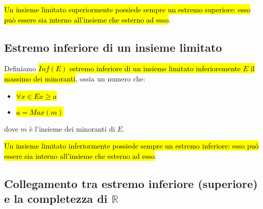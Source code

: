 \hl{Un insieme limitato superiormente possiede sempre un estremo superiore: esso 
può essere sia interno all'insieme che esterno ad esso}.

\subsection{Estremo inferiore di un insieme limitato}
Definiamo \hl{$Inf(E)$ estremo inferiore di un insieme limitato inferioremente $E$
il massimo dei minoranti}, ossia un numero che:
\begin{itemize}
    \item \hl{$\forall x \in E x \geq a$}
    \item \hl{$a = Max(\mathit{m})$} 
\end{itemize}
dove $\mathit{m}$ è l'insieme dei minoranti di $E$.

\hl{Un insieme limitato inferiormente possiede sempre un estremo inferiore: esso 
può essere sia interno all'insieme che esterno ad esso}.

\subsection{Collegamento tra estremo inferiore (superiore) e la completezza di $\mathbb{R}$}
